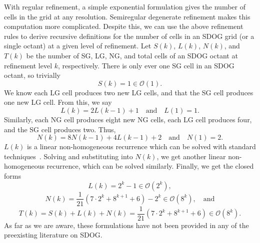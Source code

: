 With regular refinement, a simple exponential formulation gives the number of cells in the grid at any resolution.
Semiregular degenerate refinement makes this computation more complicated.
Despite this, we can use the above refinement rules to derive recursive definitions for the number of cells in an SDOG grid (or a single octant) at a given level of refinement.
Let $S(k)$, $L(k)$, $N(k)$, and $T(k)$ be the number of SG, LG, NG, and total cells of an SDOG octant at refinement level $k$, respectively.
There is only ever one SG cell in an SDOG octant, so trivially
%
\begin{equation*}
S(k) = 1 \in \mathcal{O}(1).
\end{equation*}
%
We know each LG cell produces two new LG cells, and that the SG cell produces one new LG cell.
From this, we say
%
\begin{equation*}
L(k) = 2L(k-1) + 1 \quad\text{and}\quad L(1) = 1.
\end{equation*}
%
Similarly, each NG cell produces eight new NG cells, each LG cell produces four, and the SG cell produces two.
Thus,
%
\begin{equation*}
N(k) = 8N(k-1) + 4L(k-1) + 2 \quad\text{and}\quad N(1) = 2.
\end{equation*}
%
$L(k)$ is a linear non-homogeneous recurrence which can be solved with standard techniques~\cite{bellman1963differential}.
Solving and substituting into $N(k)$, we get another linear non-homogeneous recurrence, which can be solved similarly.
Finally, we get the closed forms
%
\begin{equation*}
L(k) = 2^{k} - 1 \in \mathcal{O}(2^k),
\end{equation*}
%
\begin{equation*}
N(k) = \frac{1}{21} \left( 7 \cdot 2^{k} + 8^{k+1} + 6 \right) - 2^{k} \in \mathcal{O}(8^k), \quad\text{and}
\end{equation*}
%
\begin{equation*}
T(k) = S(k) + L(k) + N(k) = \frac{1}{21} \left( 7 \cdot 2^{k} + 8^{k+1} + 6 \right) \in \mathcal{O}(8^k).
\end{equation*}
%
As far as we are aware, these formulations have not been provided in any of the preexisting literature on SDOG.


